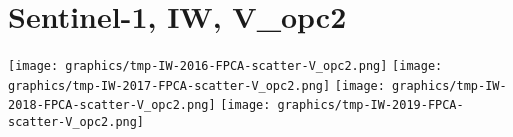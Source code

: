 
\section{Sentinel-1, IW, V\_opc2}
\setcounter{theorem}{0}

\renewcommand{\theenumi}{\roman{enumi}}
\renewcommand{\labelenumi}{\textnormal{(\theenumi)}$\;\;$}


\begin{center}
\begin{minipage}{7.0in}
\texttt{[image: graphics/tmp-IW-2016-FPCA-scatter-V\_opc2.png]}
\quad
\texttt{[image: graphics/tmp-IW-2017-FPCA-scatter-V\_opc2.png]}
\vskip 0.5cm
\texttt{[image: graphics/tmp-IW-2018-FPCA-scatter-V\_opc2.png]}
\quad
\texttt{[image: graphics/tmp-IW-2019-FPCA-scatter-V\_opc2.png]}
\end{minipage}
\end{center}


\renewcommand{\theenumi}{\roman{enumi}}
\renewcommand{\labelenumi}{\textnormal{(\theenumi)}$\;\;$}

